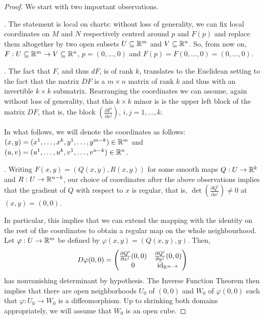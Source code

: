 \begin{proof}
	We start with two important observations.

	. The statement is local on charts: without loss of generality,
	we can fix local coordinates on $M$ and $N$ respectively centred around $p$ and $F(p)$
	and replace them altogether by two open subsets $U\subseteq \mathbb{R}^m$ and $V \subseteq \mathbb{R}^n$.
	So, from now on, $F: U \subseteq \mathbb{R}^m \to V \subseteq \mathbb{R}^n$, $p=(0,\ldots,0)$
	and $F(p) = F(0,\ldots,0) = (0,\ldots,0)$.

	. The fact that $F$, and thus $dF$, is of rank $k$, translates to
	the Euclidean setting to the fact that the matrix $DF$ is a $m\times n$ matrix of rank $k$
	and thus with an invertible $k\times k$ submatrix.
	Rearranging the coordinates we can assume, again without loss of generality, that this
	$k\times k$ minor is is the upper left block of the matrix $DF$, that is, the block
	$\left( \frac{\partial F^i}{\partial x^j} \right)$, $i,j = 1,\ldots, k$.

	In what follows, we will denote the coordinates as follows:
	$(x,y) = (x^1, \ldots, x^k, y^1, \ldots, y^{m-k})\in\mathbb{R}^m$
	and $(u,v) = (u^1, \ldots, u^k, v^1, \ldots, v^{n-k})\in\mathbb{R}^n$.
	\medskip

	.
	Writing $F(x,y) = (Q(x,y), R(x,y))$ for some smooth maps $Q: U \to \mathbb{R}^k$ and $R: U \to \mathbb{R}^{n-k}$,
	our choice of coordinates after the above observations implies that the gradient of $Q$ with respect to $x$ is regular, that is,
	$\det \left( \frac{\partial Q^i}{\partial x^j} \right) \neq 0$ at $(x,y) = (0,0)$.

	In particular, this implies that we can extend the mapping with
	the identity on the rest of the coordinates to obtain a regular map
	on the whole neighbourhood.
	Let $\varphi : U \to \mathbb{R}^m$ be defined by $\varphi(x,y) = (Q(x,y), y)$. Then,
	\begin{equation}
		D\varphi(0,0) =
		\begin{pmatrix}
			\frac{\partial Q^i}{\partial x^j}(0,0) & \frac{\partial Q^i}{\partial y^j}(0,0) \\
			0                                      & \operatorname{id}_{\mathbb{R}^{m-k}}
		\end{pmatrix}
	\end{equation}
	has nonvanishing determinant by hypothesis.
	The Inverse Function Theorem then implies that there are open neighborhoods $U_0$ of $(0,0)$
	and $W_0$ of $\varphi(0,0)$ such that $\varphi : U_0 \to W_0$ is a diffeomorphism.
	Up to shrinking both domains appropriately, we will assume that $W_0$ is an open cube.


\end{proof}
